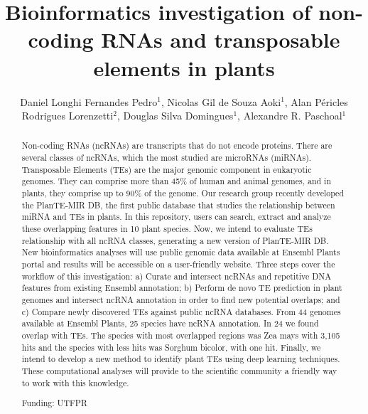 \documentclass[twoside]{article}
\title{\vspace{-15mm}\fontsize{24pt}{10pt}\selectfont\textbf{Bioinformatics investigation of non-coding RNAs and transposable elements in plants}} %
\author{Daniel Longhi Fernandes Pedro$^1$, Nicolas Gil de Souza Aoki$^1$, Alan P\'ericles Rodrigues Lorenzetti$^2$, Douglas Silva Domingues$^1$, Alexandre R. Paschoal$^1$}
\affil{1 UTFPR - PPGBIOINFO\\ 2 USP\\ }
\date{}
\begin{document}
\maketitle %

\thispagestyle{fancy} %


\begin{abstract}
Non-coding RNAs (ncRNAs) are transcripts that do not encode proteins. There are several classes of ncRNAs, which the most studied are microRNAs (miRNAs). Transposable Elements (TEs) are the major genomic component in eukaryotic genomes. They can comprise more than 45\% of human and animal genomes, and in plants, they comprise up to 90\% of the genome. Our research group recently developed the PlanTE-MIR DB, the first public database that studies the relationship between miRNA and TEs in plants. In this repository, users can search, extract and analyze these overlapping features in 10 plant species. Now, we intend to evaluate TEs relationship with all ncRNA classes, generating a new version of PlanTE-MIR DB. New bioinformatics analyses will use public genomic data available at Ensembl Plants portal and results will be accessible on a user-friendly website. Three steps cover the workflow of this investigation: a) Curate and intersect ncRNAs and repetitive DNA features from existing Ensembl annotation; b) Perform de novo TE prediction in plant genomes and intersect ncRNA annotation in order to find new potential overlaps; and c) Compare newly discovered TEs against public ncRNA databases. From 44 genomes available at Ensembl Plants, 25 species have ncRNA annotation. In 24 we found overlap with TEs. The species with most overlapped regions was Zea mays with 3,105 hits and the species with less hits was Sorghum bicolor, with one hit. Finally, we intend to develop a new method to identify plant TEs using deep learning techniques. These computational analyses will provide to the scientific community a friendly way to work with this knowledge.

Funding: UTFPR
\end{abstract}
\end{document}
